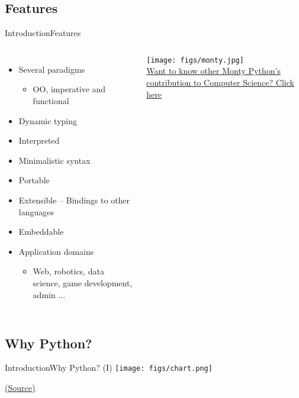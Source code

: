 \documentclass[10pt,compress]{beamer} %
\begin{document}
\subsection{Features}
\begin{frame}{Introduction}{Features}
    \begin{columns}
		\vspace{-0.3cm}
		\begin{itemize}
		\item Several paradigms
			\begin{itemize}
			\item OO, imperative and functional
			\end{itemize}
		\item Dynamic typing
		\item Interpreted
		\item Minimalistic syntax
		\item Portable
		\item Extensible -- Bindings to other languages
		\item Embeddable
		\item Application domains
			\begin{itemize}
			\item Web, robotics, data science, game development, admin ...
			\end{itemize}
		\end{itemize}
		\centering \texttt{[image: figs/monty.jpg]}\\
		\tiny{\href{https://www.youtube.com/watch?v=anwy2MPT5RE}{Want to know other Monty Python's contribution to Computer Science? Click here}}
	   \end{columns}
\end{frame}


\subsection{Why Python?}
\begin{frame}[plain]{Introduction}{Why Python? (I)}
		\centering \texttt{[image: figs/chart.png]}\\
		\begin{center}
			\tiny{\href{http://rz.scale-it.pl/2013/01/07/python___language_of_the_decade.html}{(Source)}}
		\end{center}
\end{frame}
\end{document}
